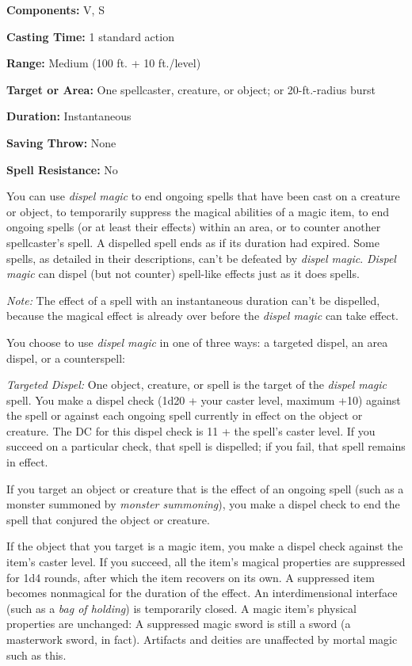 \documentclass{article}
\begin{document}
\textbf{Components:} V, S

\textbf{Casting Time:} 1 standard action

\textbf{Range: }Medium (100 ft. + 10 ft./level)

\textbf{Target or Area:} One spellcaster, creature, or object; or 20-ft.-radius 
burst

\textbf{Duration:} Instantaneous

\textbf{Saving Throw:} None

\textbf{Spell Resistance:} No

You can use \textit{dispel magic }to end ongoing spells that have been cast on 
a creature or object, to temporarily suppress the magical abilities of a magic 
item, to end ongoing spells (or at least their effects) within an area, or to counter 
another spellcaster's spell. A dispelled spell ends as if its duration had expired. 
Some spells, as detailed in their descriptions, can't be defeated by \textit{dispel 
magic}. \textit{Dispel magic }can dispel (but not counter) spell-like effects just 
as it does spells.

\textit{Note: }The effect of a spell with an instantaneous duration can't be dispelled, 
because the magical effect is already over before the \textit{dispel magic }can 
take effect. 

You choose to use \textit{dispel magic }in one of three ways: a targeted dispel, 
an area dispel, or a counterspell:

\textit{Targeted Dispel: }One object, creature, or spell is the target of the \textit{dispel 
magic }spell. You make a dispel check (1d20 + your caster level, maximum +10) against 
the spell or against each ongoing spell currently in effect on the object or creature. 
The DC for this dispel check is 11 + the spell's caster level. If you succeed on 
a particular check, that spell is dispelled; if you fail, that spell remains in 
effect.

If you target an object or creature that is the effect of an ongoing spell (such 
as a monster summoned by \textit{monster summoning}), you make a dispel check to 
end the spell that conjured the object or creature.

If the object that you target is a magic item, you make a dispel check against 
the item's caster level. If you succeed, all the item's magical properties are 
suppressed for 1d4 rounds, after which the item recovers on its own. A suppressed 
item becomes nonmagical for the duration of the effect. An interdimensional interface 
(such as a \textit{bag of holding}) is temporarily closed. A magic item's physical 
properties are unchanged: A suppressed magic sword is still a sword (a masterwork 
sword, in fact). Artifacts and deities are unaffected by mortal magic such as this.
\end{document}
